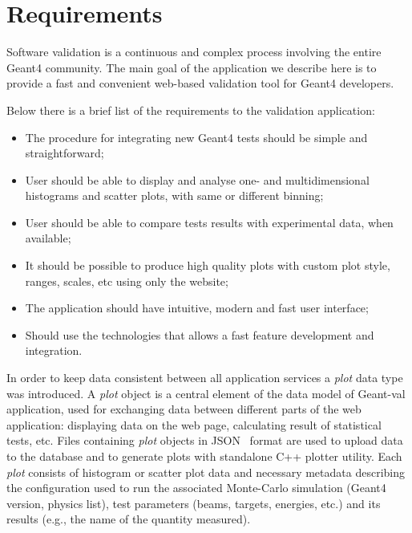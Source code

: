 \section{Requirements}
\label{sec:requirements}

Software validation is a continuous and complex process involving the entire Geant4 community. The main goal of the application we describe here is to provide a fast and convenient web-based validation tool for Geant4 developers.

Below there is a brief list of the requirements to the validation application:
\begin{itemize}
    \item The procedure for integrating new Geant4 tests should be simple and straightforward;
    \item User should be able to display and analyse one- and multidimensional histograms and scatter plots, with same or different binning;
    \item User should be able to compare tests results with experimental data, when available;
    \item It should be possible to produce high quality plots with custom plot style, ranges, scales, etc using only the website;
    \item The application should have intuitive, modern and fast user interface;
    \item Should use the technologies that allows a fast feature development and integration.
\end{itemize}

In order to keep data consistent between all application services a \textit{plot} data type was introduced. A \textit{plot} object is a central element of the data model of \textsf{Geant-val} application, used for exchanging data between different parts of the web application: displaying data on the web page, calculating result of statistical tests, etc. Files containing \textit{plot} objects in JSON~\cite{json} format are used to upload data to the database and to generate plots with standalone C++ plotter utility.
Each \textit{plot} consists of histogram or scatter plot data and necessary metadata describing the configuration used to run the associated Monte-Carlo simulation (Geant4 version, physics list), test parameters (beams, targets, energies, etc.) and its results (e.g., the name of the quantity measured).

